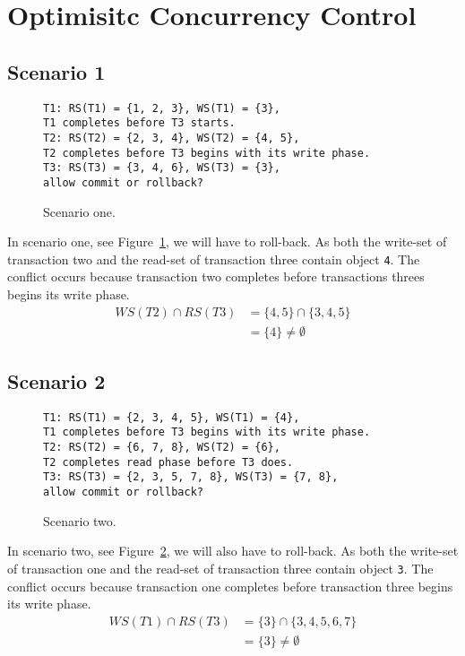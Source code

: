 \documentclass[a4paper]{article}
\begin{document}
\section{Optimisitc Concurrency Control}

\subsection*{Scenario 1}
\begin{figure}[h!]
\texttt{T1: RS(T1) = \{1, 2, 3\}, WS(T1) = \{3\},\\
T1 completes before T3 starts.\\
T2: RS(T2) = \{2, 3, 4\}, WS(T2) = \{4, 5\},\\
T2 completes before T3 begins with its write phase.\\
T3: RS(T3) = \{3, 4, 6\}, WS(T3) = \{3\},\\
allow commit or rollback?}
\caption{Scenario one.}
\label{sc1}
\end{figure}
In scenario one, see Figure~\ref{sc1}, we will have to roll-back. As both the write-set of transaction two and the read-set of transaction three contain object \texttt{4}. The conflict occurs because transaction two completes before transactions threes begins its write phase.
\begin{align}
WS(T2) \cap RS(T3) &= \{4, 5\} \cap \{3, 4, 5\}\\
&= \{4\} \neq \emptyset
\end{align}
\subsection*{Scenario 2}
\begin{figure}[h!]
\texttt{T1: RS(T1) = \{2, 3, 4, 5\}, WS(T1) = \{4\},\\
T1 completes before T3 begins with its write phase.\\
T2: RS(T2) = \{6, 7, 8\}, WS(T2) = \{6\},\\
T2 completes read phase before T3 does.\\
T3: RS(T3) = \{2, 3, 5, 7, 8\}, WS(T3) = \{7, 8\},\\
allow commit or rollback?}
\caption{Scenario two.}
\label{sc2}
\end{figure}
In scenario two, see Figure~\ref{sc2}, we will also have to roll-back. As both the write-set of transaction one and the read-set of transaction three contain object \texttt{3}. The conflict occurs because transaction one completes before transaction three begins its write phase.
\begin{align}
WS(T1) \cap RS(T3) &= \{3\} \cap \{3, 4, 5, 6, 7\}\\
&= \{3\} \neq \emptyset
\end{align}
\end{document}
